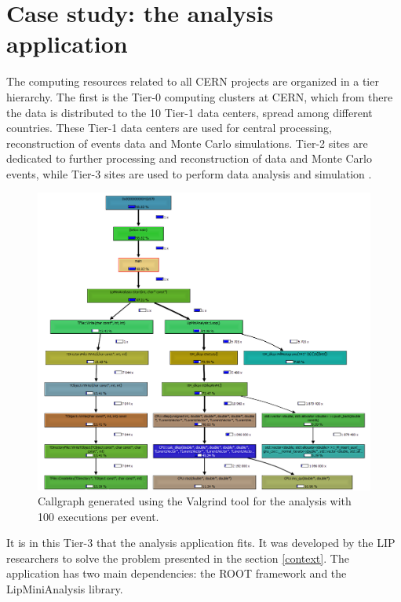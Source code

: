 
\chapter{Case study: the \tth analysis application}
\label{app}

The computing resources related to all CERN projects are organized in a tier hierarchy. The first is the Tier-0 computing clusters at CERN, which from there the data is distributed to the 10 Tier-1 data centers, spread among different countries. These Tier-1 data centers are used for central processing, reconstruction of events data and Monte Carlo simulations. Tier-2 sites are dedicated to further processing and reconstruction of data and Monte Carlo events, while Tier-3 sites are used to perform data analysis and simulation \cite{LIP:Ibergrid}.

\begin{figure}[!htp]
	\begin{center}
		\includegraphics[scale=0.6]{../../common/img/callgraph_O3_100dilep.png}
		\caption{Callgraph generated using the Valgrind tool \cite{Callgrind} for the \tth analysis with 100 \dilep executions per event.}
		\label{fig:callgraph}
	\end{center}
\end{figure}

It is in this Tier-3 that the \tth analysis application fits. It was developed by the LIP researchers to solve the problem presented in the section \ref{context}. The application has two main dependencies: the ROOT framework \cite{CERN:ROOT} and the LipMiniAnalysis library.

